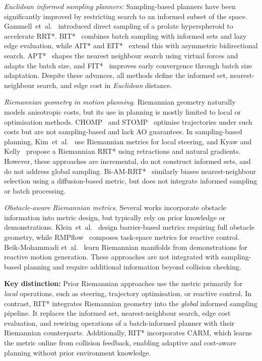 \documentclass[journal]{IEEEtran}
\begin{document}
\textit{Euclidean informed sampling planners:}
Sampling-based planners have been significantly improved by restricting
search to an informed subset of the space.
Gammell~et~al.~\cite{Gammell2018} introduced direct sampling of a
prolate hyperspheroid to accelerate RRT*. BIT*~\cite{Gammell2020}
combines batch sampling with informed sets and lazy edge evaluation,
while AIT* and EIT*~\cite{Strub2022} extend this with asymmetric
bidirectional search. APT*~\cite{APT2025} shapes the nearest neighbour search using
virtual forces and adapts the batch size, and FIT*~\cite{FIT2024} improves
early convergence through batch size adaptation. Despite these advances,
all methods define the informed set, nearest-neighbour search, and edge cost in \emph{Euclidean} distance.

\textit{Riemannian geometry in motion planning.}
Riemannian geometry naturally models anisotropic costs, but its use in
planning is mostly limited to local or optimisation methods.
CHOMP~\cite{Ratliff2009} and STOMP~\cite{Zucker2013} optimise trajectories
under such costs but are not sampling-based and lack AO guarantees.
In sampling-based planning, Kim~et~al.~\cite{Kim2016} use Riemannian
metrics for local steering, and Kyaw and Kelly~\cite{Kyaw2026} propose a
Riemannian RRT* using retractions and natural gradients. However, these
approaches are incremental, do not construct informed sets, and do not
address global sampling. Bi-AM-RRT*~\cite{Zhang2023biamrrt} similarly
biases nearest-neighbour selection using a diffusion-based metric, but
does not integrate informed sampling or batch processing.

\textit{Obstacle-aware Riemannian metrics.}
Several works incorporate obstacle information into metric design, but
typically rely on prior knowledge or demonstrations.
Klein~et~al.~\cite{Klein2023} design barrier-based metrics requiring
full obstacle geometry, while RMPflow~\cite{Cheng2018rmpflow} composes
task-space metrics for reactive control. Beik-Mohammadi
et~al.~\cite{BeikMohammadi2023} learn Riemannian manifolds from
demonstrations for reactive motion generation. These approaches are not
integrated with sampling-based planning and require additional
information beyond collision checking.

\textbf{Key distinction:}
Prior Riemannian approaches use the metric primarily for \emph{local} operations, such as steering, trajectory optimisation, or reactive control. In contrast, RIT* integrates Riemannian geometry into the
\emph{global} informed sampling pipeline. It replaces the informed set, nearest-neighbour search, edge cost evaluation, and rewiring operations of
a batch-informed planner with their Riemannian counterparts. Additionally, RIT* incorporates CARM, which learns the metric online from collision feedback, enabling adaptive and cost-aware planning
without prior environment knowledge.
\end{document}
